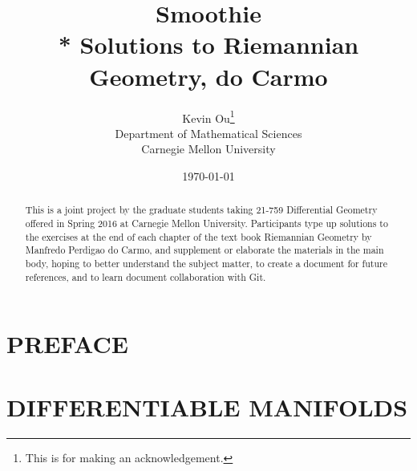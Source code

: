 \documentclass[pdftex, 12pt]{report}%
\begin{document}
\title{\Huge\bfseries Smoothie \vspace{20pt}\\* Solutions to Riemannian Geometry, do Carmo}

\author{Kevin Ou\thanks{This is for making an acknowledgement.}
	\vspace{10pt}\\Department of Mathematical Sciences
	\\Carnegie Mellon University}
\date{\today}
\maketitle


\begin{abstract}
This is a joint project by the graduate students taking 21-759 Differential Geometry offered in Spring 2016 at Carnegie Mellon University. Participants type up solutions to the exercises at the end of each chapter of the text book Riemannian Geometry by Manfredo Perdigao do Carmo, and supplement or elaborate the materials in the main body, hoping to better understand the subject matter, to create a document for future references, and to learn document collaboration with Git.
\end{abstract}

\clearpage


\lhead{} \chead{} \rhead{}


\setcounter{page}{1}

\setcounter{tocdepth}{1} %
\tableofcontents{}

\clearpage


\setcounter{page}{1}

\chapter*{PREFACE}


\clearpage

\setcounter{chapter}{-1}

\setcounter{page}{1}


\chapter{DIFFERENTIABLE MANIFOLDS}
\end{document}

